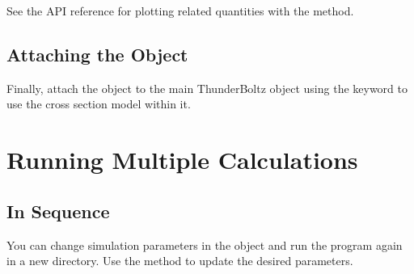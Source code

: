 \documentclass[letterpaper,10pt,english,openany,oneside]{sphinxmanual}
\begin{document}
\begin{sphinxVerbatim}[commandchars=\\\{\}]

\end{sphinxVerbatim}

\sphinxAtStartPar
See the API reference for plotting related quantities with the {\hyperref[\detokenize{api/pytb.CrossSections.plot_cs:pytb.CrossSections.plot_cs}]{}}
method.


\subsection{Attaching the  Object}
\label{\detokenize{cs_guide:attaching-the-crosssections-object}}
\sphinxAtStartPar
Finally, attach the  object to the main ThunderBoltz
object using the  keyword to use the cross section model within it.

\begin{sphinxVerbatim}[commandchars=\\\{\}]
  

\end{sphinxVerbatim}

\sphinxstepscope


\section{Running Multiple Calculations}
\label{\detokenize{multi_guide:running-multiple-calculations}}\label{\detokenize{multi_guide::doc}}

\subsection{In Sequence}
\label{\detokenize{multi_guide:in-sequence}}
\sphinxAtStartPar
You can change simulation parameters in the {\hyperref[\detokenize{api/pytb.ThunderBoltz:pytb.ThunderBoltz}]{}}
object and run the program again in a new directory. Use
the {\hyperref[\detokenize{api/pytb.ThunderBoltz.set_:pytb.ThunderBoltz.set_}]{}} method to update the desired parameters.
\end{document}
